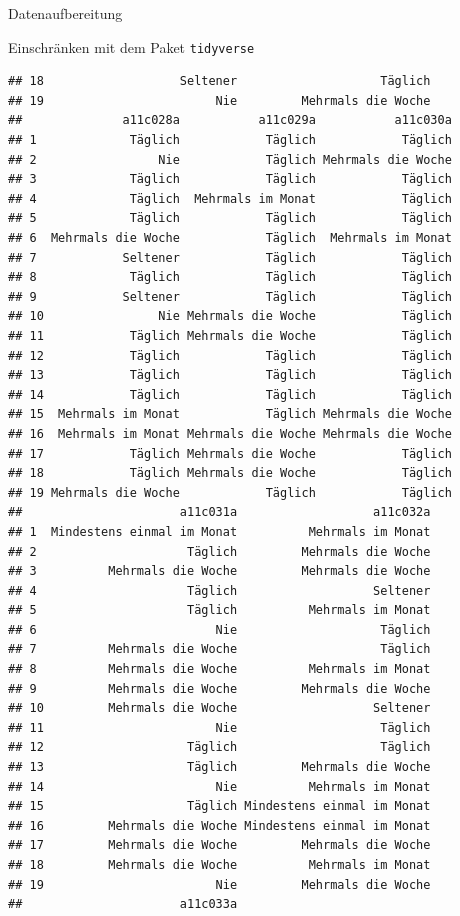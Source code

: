 \documentclass[ignorenonframetext,]{beamer}
\begin{document}
\begin{frame}[fragile]{Datenaufbereitung}
\begin{block}{Einschränken mit dem Paket \texttt{tidyverse}}
\begin{verbatim}
## 18                   Seltener                    Täglich
## 19                        Nie         Mehrmals die Woche
##              a11c028a           a11c029a           a11c030a
## 1             Täglich            Täglich            Täglich
## 2                 Nie            Täglich Mehrmals die Woche
## 3             Täglich            Täglich            Täglich
## 4             Täglich  Mehrmals im Monat            Täglich
## 5             Täglich            Täglich            Täglich
## 6  Mehrmals die Woche            Täglich  Mehrmals im Monat
## 7            Seltener            Täglich            Täglich
## 8             Täglich            Täglich            Täglich
## 9            Seltener            Täglich            Täglich
## 10                Nie Mehrmals die Woche            Täglich
## 11            Täglich Mehrmals die Woche            Täglich
## 12            Täglich            Täglich            Täglich
## 13            Täglich            Täglich            Täglich
## 14            Täglich            Täglich            Täglich
## 15  Mehrmals im Monat            Täglich Mehrmals die Woche
## 16  Mehrmals im Monat Mehrmals die Woche Mehrmals die Woche
## 17            Täglich Mehrmals die Woche            Täglich
## 18            Täglich Mehrmals die Woche            Täglich
## 19 Mehrmals die Woche            Täglich            Täglich
##                      a11c031a                   a11c032a
## 1  Mindestens einmal im Monat          Mehrmals im Monat
## 2                     Täglich         Mehrmals die Woche
## 3          Mehrmals die Woche         Mehrmals die Woche
## 4                     Täglich                   Seltener
## 5                     Täglich          Mehrmals im Monat
## 6                         Nie                    Täglich
## 7          Mehrmals die Woche                    Täglich
## 8          Mehrmals die Woche          Mehrmals im Monat
## 9          Mehrmals die Woche         Mehrmals die Woche
## 10         Mehrmals die Woche                   Seltener
## 11                        Nie                    Täglich
## 12                    Täglich                    Täglich
## 13                    Täglich         Mehrmals die Woche
## 14                        Nie          Mehrmals im Monat
## 15                    Täglich Mindestens einmal im Monat
## 16         Mehrmals die Woche Mindestens einmal im Monat
## 17         Mehrmals die Woche         Mehrmals die Woche
## 18         Mehrmals die Woche          Mehrmals im Monat
## 19                        Nie         Mehrmals die Woche
##                      a11c033a

\end{verbatim}
\end{block}
\end{frame}
\end{document}
